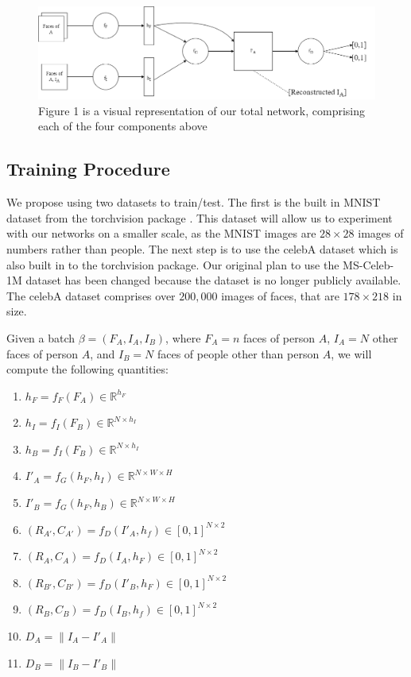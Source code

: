 \documentclass{article}
\begin{document}
\begin{figure}[hbt]
	\centering
	\includegraphics[scale=0.25]{images/OurNetwork.png}
	\caption{Figure 1 is a visual representation of our total network, comprising each of the four components above}
	\label{fig:my_label}
\end{figure}


\subsection{Training Procedure}

We propose using two datasets to train/test. The first is the built in MNIST dataset from the torchvision package \cite{deng2012mnist}. This dataset will allow us to experiment with our networks on a smaller scale, as the MNIST images are $28 \times 28$ images of numbers rather than people. The next step is to use the celebA dataset which is also built in to the torchvision package. Our original plan to use the MS-Celeb-1M dataset \cite{guo2016ms}
has been changed because the dataset is no longer publicly available. The celebA dataset comprises over $200,000$ images of faces, that are $178 \times 218$ in size.

Given a batch $\beta = (F_A, I_A, I_B)$, where $F_A = n$ faces of person $A$, $I_A = N$ other faces of person $A$, and $I_B = N $ faces of people other than person $A$, we will compute the following quantities:
\begin{enumerate}
	\item $h_F = f_F(F_A) \in \mathbb{R}^{h_F}$
	\item $h_I = f_I(F_B) \in \mathbb{R}^{N \times h_I}$
	\item $h_B = f_I(F_B) \in \mathbb{R}^{N \times h_I}$
	\item $I'_A = f_G(h_F, h_I) \in \mathbb{R}^{N \times W \times H}$
	\item $I'_B = f_G(h_F, h_B) \in \mathbb{R}^{N \times W \times H}$
	\item $(R_{A'}, C_{A'}) = f_D(I'_A, h_f) \in [0,1]^{N \times 2}$
	\item $(R_A, C_A) = f_D(I_A, h_F) \in [0,1]^{N \times 2}$
	\item $(R_{B'}, C_{B'}) = f_D(I'_B, h_F) \in [0,1]^{N \times 2}$
	\item $(R_B, C_B) = f_D(I_B, h_f) \in [0,1]^{N \times 2}$
	\item $D_A = \|I_A - I'_A\|$
	\item $D_B = \|I_B - I'_B\|$
\end{enumerate}
\end{document}
